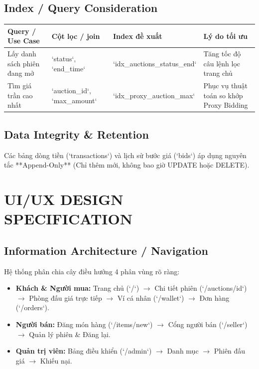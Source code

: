 \documentclass[11pt,a4paper]{article}
\begin{document}
\subsection{Index / Query Consideration}
\begin{table}[H]
    \centering
    \small
    \begin{tabularx}{\textwidth}{|l|l|l|X|}
        \hline
        \textbf{Query / Use Case} & \textbf{Cột lọc / join} & \textbf{Index đề xuất} & \textbf{Lý do tối ưu} \\ \hline
        Lấy danh sách phiên đang mở & `status`, `end_time` & `idx_auctions_status_end` & Tăng tốc độ câu lệnh lọc trang chủ \\ \hline
        Tìm giá trần cao nhất & `auction_id`, `max_amount` & `idx_proxy_auction_max` & Phục vụ thuật toán so khớp Proxy Bidding \\ \hline
    \end{tabularx}
\end{table}

\subsection{Data Integrity \& Retention}
Các bảng dòng tiền (`transactions`) và lịch sử bước giá (`bids`) áp dụng nguyên tắc **Append-Only** (Chỉ thêm mới, không bao giờ UPDATE hoặc DELETE).

\section{UI/UX DESIGN SPECIFICATION}

\subsection{Information Architecture / Navigation}
Hệ thống phân chia cây điều hướng 4 phân vùng rõ ràng:
\begin{itemize}[leftmargin=*]
    \item \textbf{Khách \& Người mua:} Trang chủ (`/`) $\rightarrow$ Chi tiết phiên (`/auctions/{id}`) $\rightarrow$ Phòng đấu giá trực tiếp $\rightarrow$ Ví cá nhân (`/wallet`) $\rightarrow$ Đơn hàng (`/orders`).
    \item \textbf{Người bán:} Đăng món hàng (`/items/new`) $\rightarrow$ Cổng người bán (`/seller`) $\rightarrow$ Quản lý phiên \& Đăng lại.
    \item \textbf{Quản trị viên:} Bảng điều khiển (`/admin`) $\rightarrow$ Danh mục $\rightarrow$ Phiên đấu giá $\rightarrow$ Khiếu nại.
\end{itemize}
\end{document}

